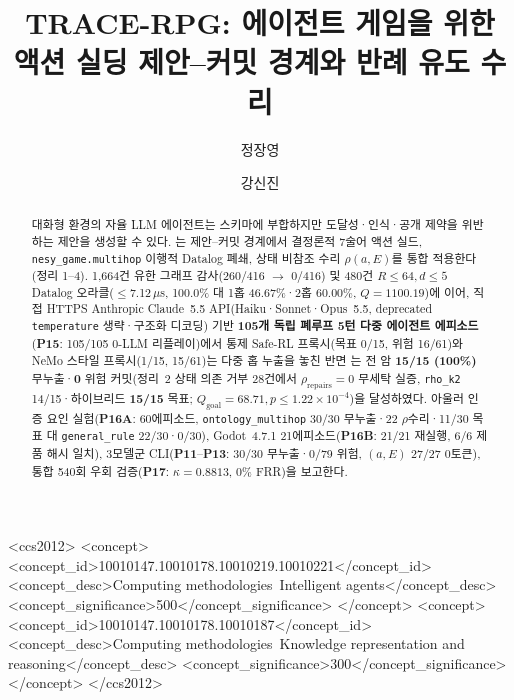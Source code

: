 \documentclass[sigconf,review]{acmart}
\begin{document}
\title{TRACE-RPG: 에이전트 게임을 위한 액션 실딩 제안--커밋 경계와 반례 유도 수리}

\author{정장영}
\author{강신진}

\begin{abstract}
대화형 환경의 자율 LLM 에이전트는 스키마에 부합하지만 도달성·인식·공개 제약을 위반하는 제안을 생성할 수 있다. \system{}는 제안--커밋 경계에서 결정론적 7술어 액션 실드, \texttt{nesy\_game.multihop} 이행적 Datalog 폐쇄, 상태 비참조 수리 $\rho(a,E)$를 통합 적용한다(정리 1--4). 1,664건 유한 그래프 감사(260/416 $\rightarrow$ 0/416) 및 480건 $R{\le}64, d{\le}5$ Datalog 오라클($\le$7.12\,$\mu$s, 100.0\% 대 1홉 46.67\%·2홉 60.00\%, $Q{=}1100.19$)에 이어, 직접 HTTPS Anthropic Claude~5.5 API(Haiku·Sonnet·Opus~5.5, deprecated \texttt{temperature} 생략·구조화 디코딩) 기반 \textbf{105개 독립 폐루프 5턴 다중 에이전트 에피소드}(\textbf{P15}: 105/105 0-LLM 리플레이)에서 통제 Safe-RL 프록시(목표 0/15, 위험 16/61)와 NeMo 스타일 프록시(1/15, 15/61)는 다중 홉 누출을 놓친 반면 \system{}는 전 암 \textbf{15/15 (100\%)} 무누출·\textbf{0} 위험 커밋(정리~2 상태 의존 거부 28건에서 $\rho_{\mathrm{repairs}}{=}0$ 무세탁 실증, \texttt{rho\_k2} 14/15·하이브리드 \textbf{15/15} 목표; $Q_{\mathrm{goal}}{=}68.71, p{\le}1.22{\times}10^{-4}$)을 달성하였다. 아울러 인증 요인 실험(\textbf{P16A}: 60에피소드, \texttt{ontology\_multihop} 30/30 무누출·22 $\rho$수리·11/30 목표 대 \texttt{general\_rule} 22/30·0/30), Godot~4.7.1 21에피소드(\textbf{P16B}: 21/21 재실행, 6/6 제품 해시 일치), 3모델군 CLI(\textbf{P11}--\textbf{P13}: 30/30 무누출·0/79 위험, $(a,E)$ 27/27 0토큰), 통합 540회 우회 검증(\textbf{P17}: $\kappa{=}0.8813$, 0\% FRR)을 보고한다.
\end{abstract}

\begin{CCSXML}
<ccs2012>
   <concept>
       <concept_id>10010147.10010178.10010219.10010221</concept_id>
       <concept_desc>Computing methodologies~Intelligent agents</concept_desc>
       <concept_significance>500</concept_significance>
   </concept>
   <concept>
       <concept_id>10010147.10010178.10010187</concept_id>
       <concept_desc>Computing methodologies~Knowledge representation and reasoning</concept_desc>
       <concept_significance>300</concept_significance>
   </concept>
</ccs2012>
\end{CCSXML}

\end{document}
